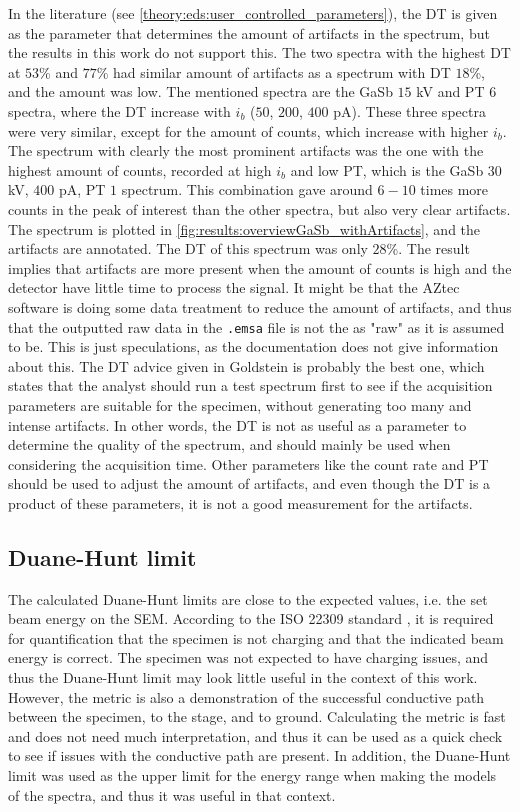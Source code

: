 In the literature (see \cref{theory:eds:user_controlled_parameters}), the DT is given as the parameter that determines the amount of artifacts in the spectrum, but the results in this work do not support this.
The two spectra with the highest DT at $53$\% and $77$\% had similar amount of artifacts as a spectrum with DT $18$\%, and the amount was low.
The mentioned spectra are the GaSb $15$ kV and PT $6$ spectra, where the DT increase with $i_b$ ($50$, $200$, $400$ pA).
These three spectra were very similar, except for the amount of counts, which increase with higher $i_b$.
The spectrum with clearly the most prominent artifacts was the one with the highest amount of counts, recorded at high $i_b$ and low PT, which is the GaSb $30$ kV, $400$ pA, PT $1$ spectrum.
This combination gave around $6-10$ times more counts in the peak of interest than the other spectra, but also very clear artifacts.
The spectrum is plotted in \cref{fig:results:overviewGaSb_withArtifacts}, and the artifacts are annotated.
The DT of this spectrum was only $28$\%.
The result implies that artifacts are more present when the amount of counts is high and the detector have little time to process the signal.
It might be that the AZtec software is doing some data treatment to reduce the amount of artifacts, and thus that the outputted raw data in the \verb|.emsa| file is not the as "raw" as it is assumed to be.
This is just speculations, as the documentation does not give information about this.
The DT advice given in Goldstein is probably the best one, which states that the analyst should run a test spectrum first to see if the acquisition parameters are suitable for the specimen, without generating too many and intense artifacts.
In other words, the DT is not as useful as a parameter to determine the quality of the spectrum, and should mainly be used when considering the acquisition time.
Other parameters like the count rate and PT should be used to adjust the amount of artifacts, and even though the DT is a product of these parameters, it is not a good measurement for the artifacts.



\subsection{Duane-Hunt limit}
\label{discussion:duane_hunt}

The calculated Duane-Hunt limits are close to the expected values, i.e. the set beam energy on the SEM.
According to the ISO 22309 standard \cite{iso_quantification_22309}, it is required for quantification that the specimen is not charging and that the indicated beam energy is correct.
The specimen was not expected to have charging issues, and thus the Duane-Hunt limit may look little useful in the context of this work.
However, the metric is also a demonstration of the successful conductive path between the specimen, to the stage, and to ground.
Calculating the metric is fast and does not need much interpretation, and thus it can be used as a quick check to see if issues with the conductive path are present.
In addition, the Duane-Hunt limit was used as the upper limit for the energy range when making the models of the spectra, and thus it was useful in that context.

